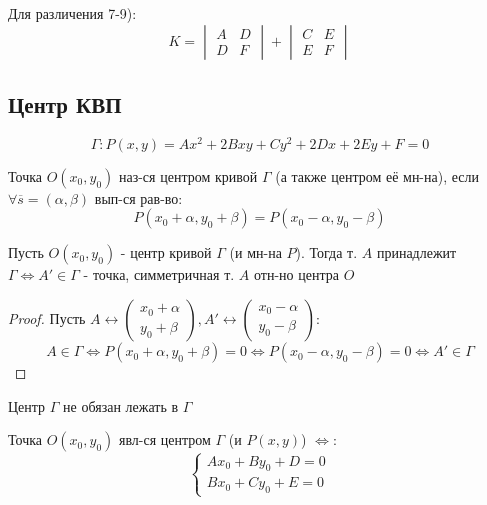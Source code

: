 Для различения 7-9):
\[
  K = \begin{vmatrix}A & D \\ D & F \end{vmatrix} + \begin{vmatrix}C & E \\ E & F \end{vmatrix}
\]
\subsection{Центр КВП}
\begin{equation}
  \label{eq:general_sol}
\Gamma \colon P(x, y) = Ax^{2} + 2Bxy + Cy^{2} + 2Dx + 2Ey + F = 0
\end{equation}
\begin{definition}
Точка $O(x_0, y_0)$ наз-ся центром кривой $\Gamma$ (а также центром её мн-на), если $\forall \overline{s} = (\alpha, \beta)$ вып-ся рав-во:
\begin{equation}
P(x_0 + \alpha, y_0 + \beta) = P(x_0 - \alpha, y_0 - \beta)
\end{equation}
\end{definition}
\begin{statement}
Пусть $O(x_0, y_0)$ - центр кривой $\Gamma$ (и мн-на $P$). Тогда т. $A$ принадлежит $\Gamma \iff A' \in \Gamma$ - точка, симметричная т. $A$ отн-но центра $O$
\end{statement}
\begin{proof}
Пусть $A \underset{}{\longleftrightarrow} \begin{pmatrix}x_0 + \alpha \\ y_0 + \beta \end{pmatrix}, A'  \underset{}{\longleftrightarrow} \begin{pmatrix}x_0 - \alpha \\ y_0 - \beta \end{pmatrix}$:
\[
A \in \Gamma \iff P(x_0 + \alpha, y_0 + \beta) = 0 \iff P(x_0 - \alpha, y_0 - \beta) = 0 \iff A' \in \Gamma
\]
\end{proof}
\begin{note}
Центр $\Gamma$ не обязан лежать в $\Gamma$
\end{note}
\begin{statement}
Точка $O(x_0, y_0)$ явл-ся центром $\Gamma$ (и $P(x, y)$) $\iff$:
\begin{equation}
  \label{seq:center_system}
\begin{cases}
Ax_0 + By_0 + D = 0 \\
Bx_0 + Cy_0 + E = 0
\end{cases}
\end{equation}
\end{statement}
